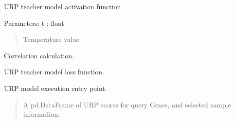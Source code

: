 \documentclass[letterpaper,10pt,english]{sphinxmanual}
\begin{document}
\begin{fulllineitems}
\begin{fulllineitems}
\end{fulllineitems}


\begin{fulllineitems}
\label{\detokenize{index:TRAPT.DLFS.FeatureSelection.get_act}}
\pysigstartsignatures
{}
\pysigstopsignatures
\sphinxAtStartPar
U\sphinxhyphen{}RP teacher model activation function.

\sphinxAtStartPar
Parameters:
t : float
\begin{quote}

\sphinxAtStartPar
Temperature value.
\end{quote}

\end{fulllineitems}


\begin{fulllineitems}
\label{\detokenize{index:TRAPT.DLFS.FeatureSelection.get_corr}}
\pysigstartsignatures
{}
\pysigstopsignatures
\sphinxAtStartPar
Correlation calculation.

\end{fulllineitems}


\begin{fulllineitems}
\label{\detokenize{index:TRAPT.DLFS.FeatureSelection.get_loss}}
\pysigstartsignatures
{}
\pysigstopsignatures
\sphinxAtStartPar
U\sphinxhyphen{}RP teacher model loss function.

\end{fulllineitems}


\begin{fulllineitems}
\label{\detokenize{index:TRAPT.DLFS.FeatureSelection.run}}
\pysigstartsignatures
{}
\pysigstopsignatures
\sphinxAtStartPar
U\sphinxhyphen{}RP model execution entry point.
\begin{quote}\begin{description}
\sphinxAtStartPar
A pd.DataFrame of U\sphinxhyphen{}RP scores for query Genes, and selected sample information.


\end{description}
\end{quote}
\end{fulllineitems}
\end{fulllineitems}
\end{document}
